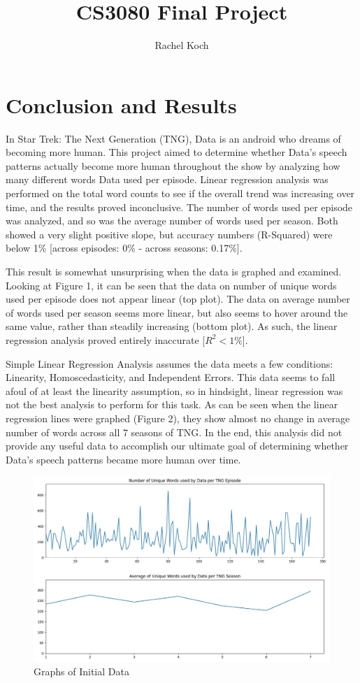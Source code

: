 \documentclass{article}
\title{CS3080 Final Project}
\author{Rachel Koch}
\begin{document}
\maketitle

\section{Conclusion and Results}

In Star Trek: The Next Generation (TNG), Data is an android who dreams of becoming more human. This project aimed to determine whether Data's speech patterns actually become more human throughout the show by analyzing how many different words Data used per episode. Linear regression analysis was performed on the total word counts to see if the overall trend was increasing over time, and the results proved inconclusive. The number of words used per episode was analyzed, and so was the average number of words used per season. Both showed a very slight positive slope, but accuracy numbers (R-Squared) were below 1\% [across episodes: 0\% - across seasons: 0.17\%].

This result is somewhat unsurprising when the data is graphed and examined. Looking at Figure 1, it can be seen that the data on number of unique words used per episode does not appear linear (top plot). The data on average number of words used per season seems more linear, but also seems to hover around the same value, rather than steadily increasing (bottom plot). As such, the linear regression analysis proved entirely inaccurate [$R^2 < 1\%$].

Simple Linear Regression Analysis assumes the data meets a few conditions: Linearity, Homoscedasticity, and Independent Errors. This data seems to fall afoul of at least the linearity assumption, so in hindsight, linear regression was not the best analysis to perform for this task. As can be seen when the linear regression lines were graphed (Figure 2), they show almost no change in average number of words across all 7 seasons of TNG. In the end, this analysis did not provide any useful data to accomplish our ultimate goal of determining whether Data's speech patterns became more human over time.

\begin{figure}[hbt!]
    \centering
    \includegraphics[width=0.75\linewidth]{Screenshot from 2024-07-27 12-03-41.png}
    \caption{Graphs of Initial Data}
    \label{fig:enter-label}
\end{figure}
\end{document}
